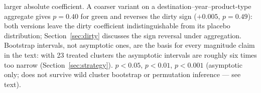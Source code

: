 \begin{threeparttable}
\begin{tablenotes}
larger absolute coefficient. A coarser variant on a destination--year--product-type
aggregate gives $p=0.40$ for green and reverses the dirty sign ($+0.005$, $p=0.49$): both
versions leave the dirty coefficient indistinguishable from its placebo distribution;
Section~\ref{sec:dirty} discusses the sign reversal under aggregation. Bootstrap
intervals, not asymptotic ones, are the basis for every magnitude claim in the text: with
23 treated clusters the asymptotic intervals are roughly six times too narrow
(Section~\ref{sec:strategy}). \sym{*} $p<0.05$,
\sym{**} $p<0.01$, \sym{***} $p<0.001$ (asymptotic only; does not survive wild cluster
bootstrap or permutation inference --- see text).
\end{tablenotes}
\end{threeparttable}
